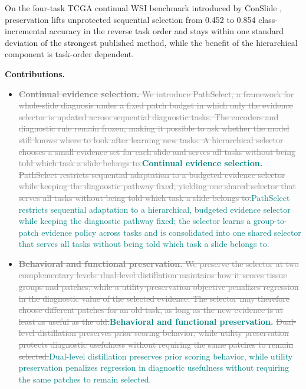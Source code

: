 \documentclass{article}
\newif\ifmarkup \markuptrue
\newcommand{\repc}[3]{\ifmarkup\textcolor{gray}{\sout{#2}}\textcolor{#1}{#3}\else#3\fi}
\newcommand{\repG}[2]{\repc{teal}{#1}{#2}}    %
\begin{document}
On the four-task TCGA continual WSI benchmark introduced by ConSlide \cite{huang2023conslide}, preservation lifts unprotected sequential selection from 0.452 to 0.854 class-incremental accuracy in the reverse task order and stays within one standard deviation of the strongest published method, while the benefit of the hierarchical component is task-order dependent.

\textbf{Contributions.}
\begin{itemize}
    \item \repG{\textbf{Continual evidence selection.} We introduce PathSelect, a framework for whole-slide diagnosis under a fixed patch budget in which only the evidence selector is updated across sequential diagnostic tasks. The encoders and diagnostic rule remain frozen, making it possible to ask whether the model still knows where to look after learning new tasks. A hierarchical selector chooses a small evidence set for each slide and serves all tasks without being told which task a slide belongs to.}{\textbf{Continual evidence selection.} \repG{PathSelect restricts sequential adaptation to a budgeted evidence selector while keeping the diagnostic pathway fixed, yielding one shared selector that serves all tasks without being told which task a slide belongs to.}{PathSelect restricts sequential adaptation to a hierarchical, budgeted evidence selector while keeping the diagnostic pathway fixed; the selector learns a group-to-patch evidence policy across tasks and is consolidated into one shared selector that serves all tasks without being told which task a slide belongs to.}}
    \item \repG{\textbf{Behavioral and functional preservation.} We preserve the selector at two complementary levels: dual-level distillation maintains how it scores tissue groups and patches, while a utility-preservation objective penalizes regression in the diagnostic value of the selected evidence. The selector may therefore choose different patches for an old task, as long as the new evidence is at least as useful as the old.}{\textbf{Behavioral and functional preservation.} \repG{Dual-level distillation preserves prior scoring behavior, while utility preservation protects diagnostic usefulness without requiring the same patches to remain selected.}{Dual-level distillation preserves prior scoring behavior, while utility preservation penalizes regression in diagnostic usefulness without requiring the same patches to remain selected.}}

\end{itemize}
\end{document}
